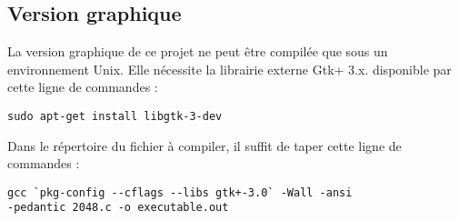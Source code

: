 ﻿\documentclass[11pt]{article}
\begin{document}
\subsection{Version graphique}

La version graphique de ce projet ne peut être compilée que sous un environnement Unix. Elle nécessite la librairie externe Gtk+ 3.x. disponible par cette ligne de commandes :
\begin{verbatim}
sudo apt-get install libgtk-3-dev
\end{verbatim}

Dans le répertoire du fichier à compiler, il suffit de taper cette ligne de commandes :
\begin{verbatim}
gcc `pkg-config --cflags --libs gtk+-3.0` -Wall -ansi 
-pedantic 2048.c -o executable.out
\end{verbatim}
\end{document}
